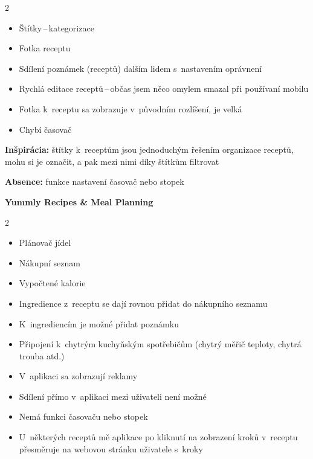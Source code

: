 \documentclass[a4paper, 11pt]{article}
\newcommand{\plus}{\textbf{\color{ForestGreen}+}}
\renewcommand{\minus}{\textbf{\color{Red}-}}
\begin{document}
    \begin{multicols}{2}
    \begin{itemize}
        \item[\textbf{\plus}] Štítky\,--\,kategorizace
        \item[\textbf{\plus}] Fotka receptu
        \item[\textbf{\plus}] Sdílení poznámek (receptů) dalším lidem s~nastavením oprávnení
        \item[\textbf{\minus}] Rychlá editace receptů\,--\,občas jsem něco omylem smazal při používaní mobilu
        \item[\textbf{\minus}] Fotka k~receptu sa zobrazuje v~původním rozlíšení, je velká
        \item[\textbf{\minus}] Chybí časovač
    \end{itemize}
    \end{multicols}

    \textbf{Inšpirácia:} štítky k~receptům jsou jednoduchým řešením organizace receptů,
    mohu si je označit, a pak mezi nimi díky štítkům filtrovat

    \textbf{Absence:} funkce nastavení časovač nebo stopek

    \newpage

    \noindent\textbf{Yummly Recipes \& Meal Planning} 

    \begin{multicols}{2}
    \begin{itemize}
        \item[\textbf{\plus}] Plánovač jídel
        \item[\textbf{\plus}] Nákupní seznam
        \item[\textbf{\plus}] Vypočtené kalorie 
        \item[\textbf{\plus}] Ingredience z~receptu se dají rovnou přidat do nákupního seznamu
        \item[\textbf{\plus}] K~ingrediencím je možné přidat poznámku
        \item[\textbf{\plus}] Připojení k~chytrým kuchyňským spotřebičům (chytrý měřič teploty, chytrá trouba atd.) 
        \item[\textbf{\minus}] V~aplikaci sa zobrazují reklamy
        \item[\textbf{\minus}] Sdílení přímo v~aplikaci mezi uživateli není možné
        \item[\textbf{\minus}] Nemá funkci časovaču nebo stopek 
        \item[\textbf{\minus}] U~některých receptů mě aplikace po kliknutí na zobrazení kroků v~receptu přesměruje na webovou stránku uživatele s~kroky
    \end{itemize}
    \end{multicols}
\end{document}
